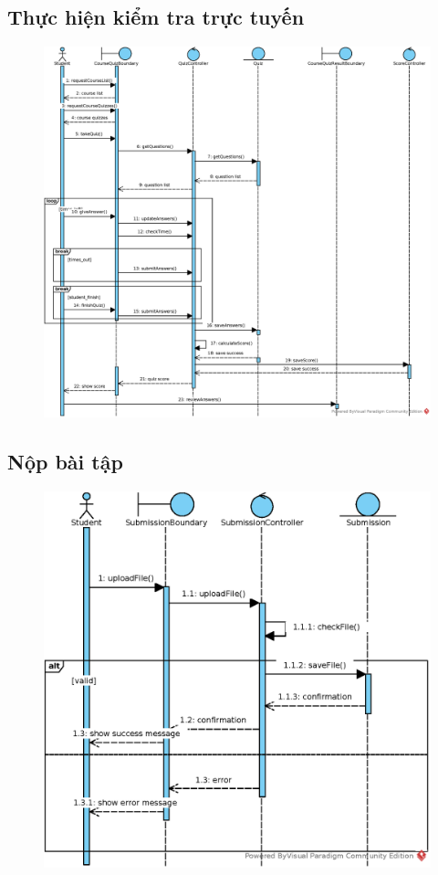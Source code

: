 \documentclass[./../main_file.tex]{subfiles}
\begin{document}
	\subsection{Thực hiện kiểm tra trực tuyến }
	\begin{figure}[H]
		\centering
		\includegraphics[width=\linewidth]{./images/sequence_diagram/3_7_take_test.eps}
	\end{figure}
	
	\subsection{Nộp bài tập}
	\begin{figure}[H]
		\centering
		\includegraphics[width=.8\linewidth]{./images/sequence_diagram/3_8_submit_assignment.eps}
	\end{figure}
	
\end{document}
